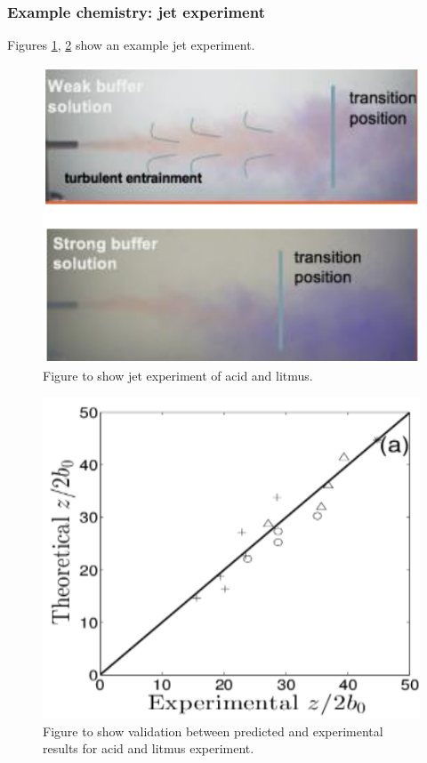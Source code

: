 \subsubsection{Example chemistry: jet experiment}
Figures \ref{jet1}, \ref{jet2} show an example jet experiment.
\begin{figure}[htbp]
    \centering
    \includegraphics[width = 0.5 \textwidth]{./img/figure82.png}
    \caption{Figure to show jet experiment of acid and litmus.}
    \label{jet1}
\end{figure}
\begin{figure}[htbp]
    \centering
    \includegraphics[width = 0.5 \textwidth]{./img/figure83.png}
    \caption{Figure to show validation between predicted and experimental results for acid and litmus experiment.}
    \label{jet2}
\end{figure}
